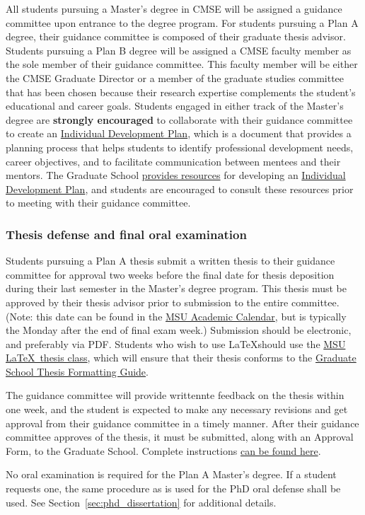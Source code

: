 All students pursuing a Master's degree in CMSE will be assigned a
guidance committee upon entrance to the degree program.  For students
pursuing a Plan A degree, their guidance committee is composed of
their graduate thesis advisor.  Students pursuing a Plan B degree will
be assigned a CMSE faculty member as the sole member of their guidance
committee.  This faculty member will be either the CMSE Graduate
Director or a member of the graduate studies committee that has been
chosen because their research expertise complements the student's
educational and career goals.  Students
engaged in either track of the Master's degree are \textbf{strongly encouraged}
to collaborate with their guidance committee to create an
\href{http://caffe.grd.msu.edu/IDP}{Individual Development Plan},
which is a document that provides a planning process that helps
students to identify professional development needs, career
objectives, and to facilitate communication between mentees and their
mentors.  The Graduate School
\href{https://grad.msu.edu/prep}{provides resources} for developing an
\href{http://caffe.grd.msu.edu/IDP}{Individual Development Plan}, and
students are encouraged to consult these resources prior to meeting
with their guidance committee.

\subsubsection{Thesis defense and final oral examination}

Students pursuing a Plan A thesis submit a written thesis to their
guidance committee for approval two weeks before the final date for
thesis deposition during their last semester in the Master's degree
program.  This thesis must  be approved by their thesis advisor prior
to submission to the entire committee.  (Note: this date can be found in the
\href{https://reg.msu.edu/ROInfo/Calendar/Academic.aspx}{MSU Academic
Calendar}, but is typically the Monday after the end of final exam
week.)  Submission should be electronic, and preferably via PDF.
Students who wish to use \LaTeX should use the
\href{http://ctan.org/pkg/msu-thesis}{MSU \LaTeX\ thesis class}, which
will ensure that their thesis conforms to the
\href{https://grad.msu.edu/etd/formatting-guide}{Graduate School
Thesis Formatting Guide}.

The guidance committee will provide writtennte feedback on the thesis within one
week, and the student is expected to make any necessary revisions and
get approval from their guidance committee in a timely manner.  After
their guidance committee approves of the thesis, it must be submitted,
along with an Approval Form, to the Graduate School.  Complete
instructions \href{https://grad.msu.edu/etd}{can be found here}.

No oral examination is required for the Plan A Master's degree.  If a
student requests one, the same procedure as is used for the PhD oral
defense shall be used.  See Section~\ref{sec:phd_dissertation} for
additional details.